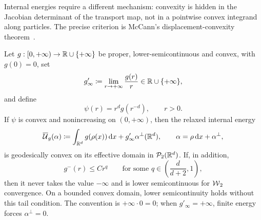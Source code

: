 Internal energies require a different mechanism: convexity is hidden in the Jacobian determinant of the transport map, not in a pointwise convex integrand along particles. The precise criterion is McCann's displacement-convexity theorem~\citep{mccann1997convexity}.

\begin{thm}\label{thm-mccann-internal-energy}
	Let \(g:[0,+\infty)\to\mathbb{R}\cup\{+\infty\}\) be proper, lower-semicontinuous and convex, with \(g(0)=0\), set
	\[
		g'_\infty\coloneqq\lim_{r\to+\infty}\frac{g(r)}r\in\mathbb{R}\cup\{+\infty\},
	\]
	and define
	\[
		\psi(r)=r^d g(r^{-d}),\qquad r>0.
	\]
	If \(\psi\) is convex and nonincreasing on \((0,+\infty)\), then the relaxed internal energy
	\[
		\overline{\mathcal U}_g(\alpha)
		\coloneqq
		\int_{\mathbb{R}^d}g(\rho(x))\,\mathrm{d} x
		+g'_\infty\alpha^\perp(\mathbb{R}^d),
		\qquad
		\alpha=\rho\,\mathrm{d} x+\alpha^\perp,
	\]
	is geodesically convex on its effective domain in \(\mathcal{P}_2(\mathbb{R}^d)\). If, in addition,
	\[
		g^-(r)\leq C r^q
		\qquad\text{for some }q\in\left(\frac{d}{d+2},1\right),
	\]
	then it never takes the value \(-\infty\) and is lower semicontinuous for \(\operatorname{\mathcal{W}}_2\) convergence. On a bounded convex domain, lower semicontinuity holds without this tail condition. The convention is \(+\infty\cdot0=0\); when \(g'_\infty=+\infty\), finite energy forces \(\alpha^\perp=0\).
\end{thm}
